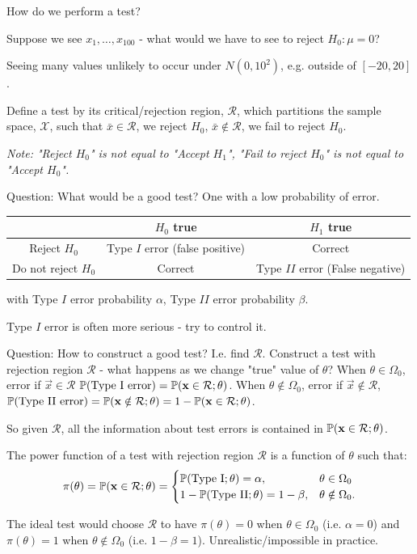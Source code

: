 \documentclass[10pt, a4paper]{article}
\begin{document}
How do we perform a test?
\begin{example}
    Suppose we see $x_1, \dotsc, x_{100}$ -
    what would we have to see to reject $H_0 : \mu = 0$?

    Seeing many values unlikely to occur under $N(0, 10 ^ 2)$,
    e.g. outside of $[-20, 20]$.
\end{example}

\begin{definition}
    Define a test by its critical/rejection region,
    $\mathcal{R}$,
    which partitions the sample space,
    $\mathcal{X}$,
    such that $\bar{x} \in \mathcal{R}$,
    we reject $H_0$,
    $\bar{x} \notin \mathcal{R}$,
    we fail to reject $H_0$.
\end{definition}

\textit{Note:
"Reject $H_0$" is not equal to "Accept $H_1$",
"Fail to reject $H_0$" is not equal to "Accept $H_0$".}

Question:
What would be a good test?
One with a low probability of error.

\begin{table}[ht]
    \centering
    \begin{tabular}{c|c|c}
         \phantom{} & $H_0$ true & $H_1$ true  \\
         \hline
         Reject $H_0$ & Type $I$ error (false positive) & Correct \\
         Do not reject $H_0$ & Correct & Type $II$ error (False negative)
    \end{tabular}
\end{table}
with Type $I$ error probability $\alpha$,
Type $II$ error probability $\beta$.

Type $I$ error is often more serious -
try to control it.

Question:
How to construct a good test?
I.e. find $\mathcal{R}$.
Construct a test with rejection region $\mathcal{R}$ -
what happens as we change "true" value of $\theta$?
When $\theta \in \Omega_0$,
error if $\vec{x} \in \mathcal{R}$ $\P(\text{Type I error}) = \P(\vec{x} \in \mathcal{R}; \theta)$.
When $\theta \notin \Omega_0$,
error if $\vec{x} \notin \mathcal{R}$,
$\P(\text{Type II error}) = \P(\vec{x} \notin \mathcal{R}; \theta) = 1 - \P(\vec{x} \in \mathcal{R}; \theta)$.

So given $\mathcal{R}$,
all the information about test errors is contained in $\P(\vec{x} \in \mathcal{R}; \theta)$.

\begin{definition}
    The power function of a test with rejection region $\mathcal{R}$ is a function of $\theta$ such that:
    \[
    \pi(\theta) = \P(\vec{x} \in \mathcal{R}; \theta) = \begin{cases}
        \P(\text{Type I}; \theta) = \alpha, & \theta \in \Omega_0 \\
        1 - \P(\text{Type II}; \theta) = 1 - \beta, &\theta \notin\Omega_0.
    \end{cases}
    \]
\end{definition}
The ideal test would choose $\mathcal{R}$ to have $\pi(\theta) = 0$ when $\theta \in \Omega_0$
(i.e. $\alpha = 0$)
and $\pi(\theta) = 1$ when $\theta \notin \Omega_0$
(i.e. $1 - \beta = 1$).
Unrealistic/impossible in practice.
\end{document}
